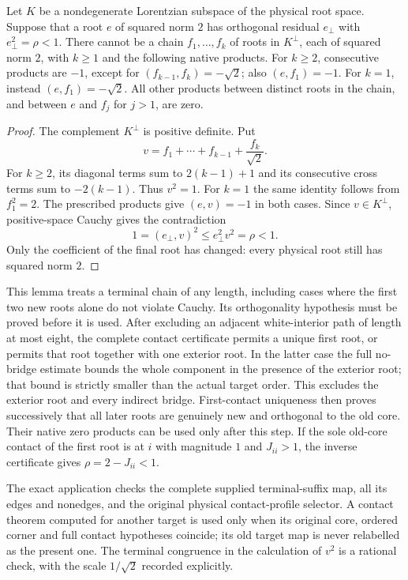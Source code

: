 \begin{lemma}
\label{lem:terminal-b-tail}
Let $K$ be a nondegenerate Lorentzian subspace of the physical root space.
Suppose that a root $e$ of squared norm $2$ has orthogonal residual
$e_\perp$ with $e_\perp^2=\rho<1$. There cannot be a chain
$f_1,\ldots,f_k$ of roots in $K^\perp$, each of squared norm $2$,
with $k\ge1$ and the following native products. For $k\ge2$, consecutive products
are $-1$, except for $(f_{k-1},f_k)=-\sqrt2$; also
$(e,f_1)=-1$. For $k=1$, instead $(e,f_1)=-\sqrt2$.
All other products between distinct roots in the chain, and between
$e$ and $f_j$ for $j>1$, are zero.
\end{lemma}

\begin{proof}
The complement $K^\perp$ is positive definite. Put
\[
 v=f_1+\cdots+f_{k-1}+\frac{f_k}{\sqrt2}.
\]
For $k\ge2$, its diagonal terms sum to $2(k-1)+1$ and its
consecutive cross terms sum to $-2(k-1)$. Thus $v^2=1$.
For $k=1$ the same identity follows from $f_1^2=2$.
The prescribed products give $(e,v)=-1$ in both cases.
Since $v\in K^\perp$, positive-space Cauchy gives the contradiction
\[
 1=(e_\perp,v)^2\le e_\perp^2v^2=\rho<1.
\]
Only the coefficient of the final root has changed: every physical
root still has squared norm $2$.
\end{proof}

This lemma treats a terminal chain of any length, including cases where
the first two new roots alone do not violate Cauchy. Its orthogonality
hypothesis must be proved before it is used. After excluding an adjacent
white-interior path of length at most eight, the complete contact
certificate permits a unique first root, or permits
that root together with one exterior root. In the latter case the
full no-bridge estimate bounds the whole component in the presence of
the exterior root; that bound is strictly smaller than the actual target
order. This excludes the exterior root and every indirect bridge.
First-contact uniqueness then proves successively that all later roots
are genuinely new and orthogonal to the old core. Their native zero
products can be used only after this step. If the sole old-core contact of the first root
is at $i$ with magnitude $1$ and $J_{ii}>1$, the inverse certificate gives
$\rho=2-J_{ii}<1$.

The exact application checks the complete supplied terminal-suffix map,
all its edges and nonedges, and the original physical contact-profile
selector. A contact theorem computed for another target is used only
when its original core, ordered corner and full contact hypotheses
coincide; its old target map is never relabelled as the present one.
The terminal congruence in the calculation of $v^2$ is a rational check,
with the scale $1/\sqrt2$ recorded explicitly.

